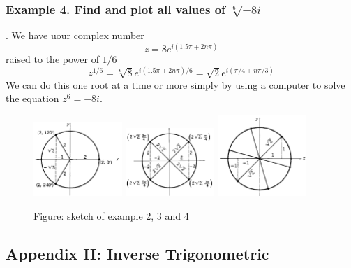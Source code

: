 \documentclass[../../../main.tex]{subfiles}
\begin{document}
\subsubsection{Example 4. Find and plot all values of $\sqrt[6]{-8i}$}. We have uour complex number
\begin{equation*}
    z=8e^{i(1.5\pi+2n\pi)}
\end{equation*}
raised to the power of $1/6$
\begin{equation*}
    z^{1/6}=\sqrt[6]{8} e^{i(1.5\pi+2n\pi)/6}=\sqrt{2}e^{i(\pi/4+n\pi/3)}
\end{equation*}
We can do this one root at a time or more simply by using a computer to solve the equation $z^6 = -8i$.
\begin{figure}[h]
    \centering
    \includegraphics[width=0.3\textwidth]{../../../Rss/AnalyticsApproach/Com/AppendEx1.2.png}
    \includegraphics[width=0.3\textwidth]{../../../Rss/AnalyticsApproach/Com/AppendEx1.3.png}
    \includegraphics[width=0.3\textwidth]{../../../Rss/AnalyticsApproach/Com/AppendEx1.4.png}
    \caption*{Figure: sketch of example 2, 3 and 4}
\end{figure} 

\subsection{Appendix II: Inverse Trigonometric} 
\end{document}
